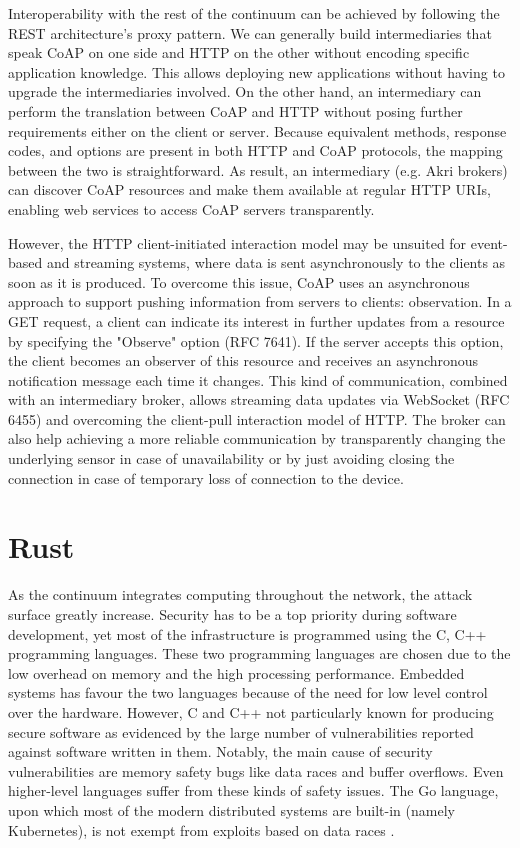 Interoperability with the rest of the continuum can be achieved by following the REST architecture's proxy pattern. We can generally build intermediaries that speak CoAP on one side and HTTP on the other without encoding specific application knowledge. This allows deploying new applications without having to upgrade the intermediaries involved. On the other hand, an intermediary can perform the translation between CoAP and HTTP without posing further requirements either on the client or server. Because equivalent methods, response codes, and options are present in both HTTP and CoAP protocols, the mapping between the two is straightforward. As result, an intermediary (e.g. Akri brokers) can discover CoAP resources and make them available at regular HTTP URIs, enabling web services to access CoAP servers transparently.

However, the HTTP client-initiated interaction model may be unsuited for event-based and streaming systems, where data is sent asynchronously to the clients as soon as it is produced. To overcome this issue, CoAP uses an asynchronous approach to support pushing information from servers to clients: observation. In a GET request, a client can indicate its interest in further updates from a resource by specifying the "Observe" option (RFC 7641). If the server accepts this option, the client becomes an observer of this resource and receives an asynchronous notification message each time it changes. This kind of communication, combined with an intermediary broker, allows streaming data updates via WebSocket (RFC 6455) and overcoming the client-pull interaction model of HTTP. The broker can also help achieving a more reliable communication by transparently changing the underlying sensor in case of unavailability or by just avoiding closing the connection in case of temporary loss of connection to the device.

\section{Rust}
\label{sec:rust}

As the continuum integrates computing throughout the network, the attack surface greatly increase. Security has to be a top priority during software development, yet most of the infrastructure is programmed using the C, C++ programming languages. These two programming languages are chosen due to the low overhead on memory and the high processing performance. Embedded systems has favour the two languages because of the need for low level control over the hardware.  However, C and C++ not particularly known for producing secure software as evidenced by the large number of vulnerabilities reported against software written in them. Notably, the main cause of security vulnerabilities are memory safety bugs like data races and buffer overflows. Even higher-level languages suffer from these kinds of safety issues. The Go language, upon which most of the modern distributed systems are built-in (namely Kubernetes), is not exempt from exploits based on data races \cite{go-data-races}.

